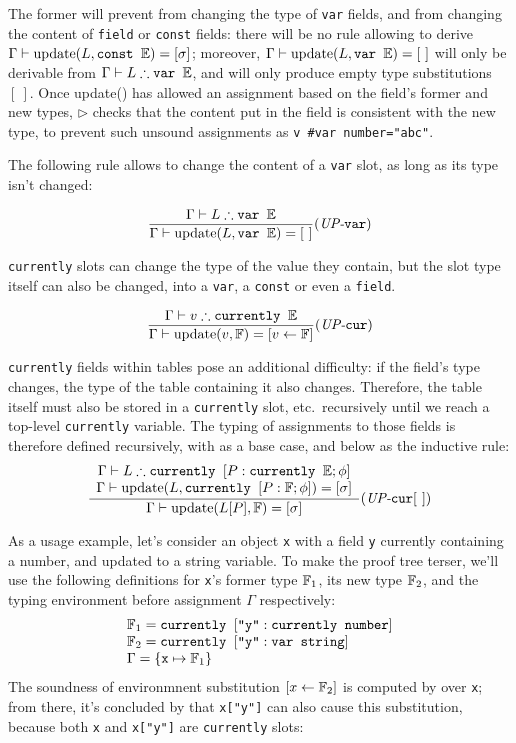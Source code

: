 The former will prevent from changing the type of \verb+var+ fields,
and from changing the content of \verb+field+ or \verb+const+ fields:
there will be no rule allowing to derive $\Gamma\vdash\textrm{update}(L, \texttt{const }\mathbb{E})=[\sigma]$; moreover, $\Gamma\vdash\textrm{update}(L, \texttt{var }\mathbb{E})=[\ ]$ will
only be derivable from $\Gamma\vdash L\therefore\texttt{var }\mathbb{E}$, and will only
produce empty type substitutions $[\ ]$. Once update() has allowed an
assignment based on the field's former and new types, $\rhd$ checks
that the content put in the field is consistent with the new type, to
prevent such unsound assignments as {\tt v \#var number="abc"}.

The following rule allows to change the content of a \verb+var+ slot,
as long as its type isn't changed:

$$\frac
{\Gamma\vdash L \therefore \texttt{var }\mathbb{E}}
{\Gamma\vdash \textrm{update}(L, \texttt{var }\mathbb{E}) = [\ ]}
(\textit{UP-{\tt var}})
$$


\verb+currently+ slots can change the type of the value they contain,
but the slot type itself can also be changed, into a \verb+var+, a
\verb+const+ or even a \verb+field+.

$$\frac
{\Gamma\vdash v \therefore \texttt{currently }\mathbb{E}}
{\Gamma\vdash \textrm{update}(v, \mathbb{F}) = [v\leftarrow\mathbb{F}]}
(\textit{UP-{\tt cur}})
$$

\verb+currently+ fields within tables pose an additional difficulty:
if the field's type changes, the type of the table containing it also
changes. Therefore, the table itself must also be stored in a
\verb+currently+ slot, etc.\ recursively until we reach a top-level
\verb+currently+ variable. The typing of assignments to those fields
is therefore defined recursively, with  as a
base case, and  below as the inductive
rule:
%
$$\frac
{ 
  \begin{array}{c}
    \Gamma\vdash L \therefore \texttt{currently }[P:\texttt{currently }\mathbb{E}; \phi]\\
    \Gamma\vdash \textrm{update}(L, \texttt{currently }[P:\mathbb{F}; \phi]) = [\sigma]\\
  \end{array}
} {
  \Gamma\vdash\textrm{update}(L[P], \mathbb{F}) = [\sigma]
}
(\textit{UP-{\tt cur}$[\ ]$})
$$


As a usage example, let's consider an object \verb+x+ with a field
\verb+y+ currently containing a number, and updated to a string
variable. To make the proof tree terser, we'll use the following
definitions for \verb+x+'s former type $\mathbb{F}_1$, its new type $\mathbb{F}_2$, and the typing environment before assignment $\Gamma$
respectively:
%
$$
  \begin{array}{l}
    \mathbb{F}_1 = \texttt{currently }[\texttt{"y"}:\texttt{currently }\texttt{number}]\\
    \mathbb{F}_2 = \texttt{currently }[\texttt{"y"}:\texttt{var }\texttt{string}]\\
    \Gamma = \{\texttt{x}\mapsto\mathbb{F}_1\} \\
  \end{array}
$$
%
The soundness of environmnent substitution $[x\leftarrow\mathbb{F}_2]$ is
computed by  over {\tt x}; from there, it's
concluded by  that \verb+x["y"]+ can also
cause this substitution, because both \verb+x+ and \verb+x["y"]+ are
\verb+currently+ slots:

